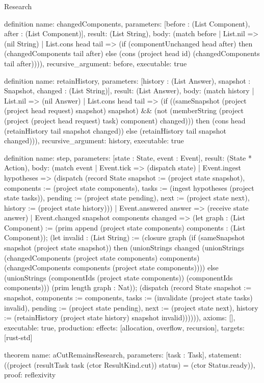 \begin{lexlean}{Research}
\begin{semanticmodule}
definition{
  name: changedComponents,
  parameters: [before : (List Component), after : (List Component)],
  result: (List String),
  body: (match before
    | List.nil => (nil String)
    | List.cons head tail => (if (componentUnchanged head after) then (changedComponents tail after) else (cons (project head id) (changedComponents tail after)))),
  recursive_argument: before,
  executable: true
}

definition{
  name: retainHistory,
  parameters: [history : (List Answer), snapshot : Snapshot, changed : (List String)],
  result: (List Answer),
  body: (match history
    | List.nil => (nil Answer)
    | List.cons head tail => (if ((sameSnapshot (project (project head request) snapshot) snapshot) && (not (memberString (project (project (project head request) task) component) changed))) then (cons head (retainHistory tail snapshot changed)) else (retainHistory tail snapshot changed))),
  recursive_argument: history,
  executable: true
}

definition{
  name: step,
  parameters: [state : State, event : Event],
  result: (State * Action),
  body: (match event
    | Event.tick => (dispatch state)
    | Event.ingest hypotheses => (dispatch (record State {snapshot := (project state snapshot), components := (project state components), tasks := (ingest hypotheses (project state tasks)), pending := (project state pending), next := (project state next), history := (project state history)}))
    | Event.answered answer => (receive state answer)
    | Event.changed snapshot components changed => (let graph : (List Component) := (prim append (project state components) components : (List Component)); (let invalid : (List String) := (closure graph (if (sameSnapshot snapshot (project state snapshot)) then (unionStrings changed (unionStrings (changedComponents (project state components) components) (changedComponents components (project state components)))) else (unionStrings (componentIds (project state components)) (componentIds components))) (prim length graph : Nat)); (dispatch (record State {snapshot := snapshot, components := components, tasks := (invalidate (project state tasks) invalid), pending := (project state pending), next := (project state next), history := (retainHistory (project state history) snapshot invalid)}))))),
  axioms: [],
  executable: true,
  production: {effects: [allocation, overflow, recursion], targets: [rust-std]}
}

theorem{
  name: aCutRemainsResearch,
  parameters: [task : Task],
  statement: ((project (resultTask task (ctor ResultKind.cut)) status) = (ctor Status.ready)),
  proof: reflexivity{}
}


\end{semanticmodule}
\end{lexlean}
